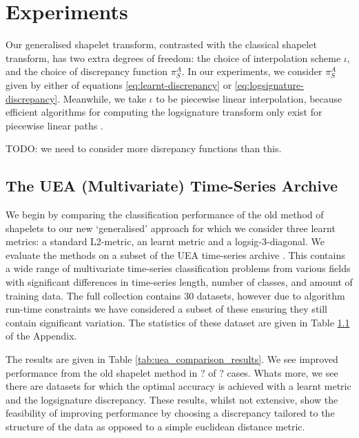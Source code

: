 \section{Experiments}
Our generalised shapelet transform, contrasted with the classical shapelet transform, has two extra degrees of freedom: the choice of interpolation scheme $\iota$, and the choice of discrepancy function $\pi^A_S$. In our experiments, we consider $\pi^A_S$ given by either of equations \eqref{eq:learnt-discrepancy} or \eqref{eq:logsignature-discrepancy}. Meanwhile, we take $\iota$ to be piecewise linear interpolation, because efficient algorithms for computing the logsignature transform only exist for piecewise linear paths \cite{signatory}.

TODO: we need to consider more disrepancy functions than this.


\subsection{The UEA (Multivariate) Time-Series Archive}
We begin by comparing the classification performance of the old method of shapelets to our new `generalised' approach for which we consider three learnt metrics: a standard L2-metric, an learnt metric and a logsig-3-diagonal. We evaluate the methods on a subset of the UEA time-series archive \cite{bagnall2018uea}. This contains a wide range of multivariate time-series classification problems from various fields with significant differences in time-series length, number of classes, and amount of training data. The full collection contains 30 datasets, however due to algorithm run-time constraints we have considered a subset of these ensuring they still contain significant variation. The statistics of these dataset are given in Table \ref{} of the Appendix.

The results are given in Table \ref{tab:uea_comparison_results}. We see improved performance from the old shapelet method in ? of ? cases. Whats more, we see there are datasets for which the optimal accuracy is achieved with a learnt metric and the logsignature discrepancy. These results, whilst not extensive, show the feasibility of improving performance by choosing a discrepancy tailored to the structure of the data as opposed to a simple euclidean distance metric.
\begin{table}[ht]
    \centering
    \caption{}
    \label{tab:uea_comparison_results}
    
\end{table}


